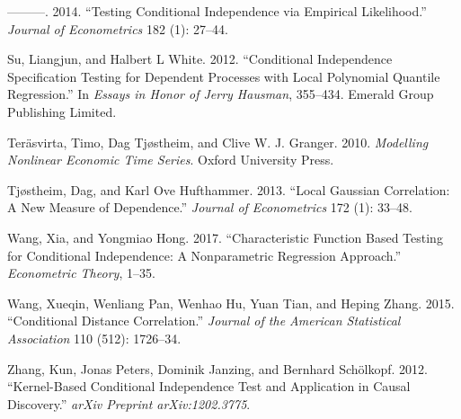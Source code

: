 \documentclass[
  12pt,
  letterpaper]{article}
\theoremstyle{definition}
\theoremstyle{definition}
\theoremstyle{definition}
\theoremstyle{remark}
\begin{document}
\leavevmode\hypertarget{ref-su2014testing}{}%
---------. 2014. ``Testing Conditional Independence via Empirical Likelihood.'' \emph{Journal of Econometrics} 182 (1): 27--44.

\leavevmode\hypertarget{ref-su2012conditional}{}%
Su, Liangjun, and Halbert L White. 2012. ``Conditional Independence Specification Testing for Dependent Processes with Local Polynomial Quantile Regression.'' In \emph{Essays in Honor of Jerry Hausman}, 355--434. Emerald Group Publishing Limited.

\leavevmode\hypertarget{ref-terasvirta2010modelling}{}%
Teräsvirta, Timo, Dag Tjøstheim, and Clive W. J. Granger. 2010. \emph{Modelling Nonlinear Economic Time Series}. Oxford University Press.

\leavevmode\hypertarget{ref-tjostheim2013local}{}%
Tjøstheim, Dag, and Karl Ove Hufthammer. 2013. ``Local Gaussian Correlation: A New Measure of Dependence.'' \emph{Journal of Econometrics} 172 (1): 33--48.

\leavevmode\hypertarget{ref-wang2017characteristic}{}%
Wang, Xia, and Yongmiao Hong. 2017. ``Characteristic Function Based Testing for Conditional Independence: A Nonparametric Regression Approach.'' \emph{Econometric Theory}, 1--35.

\leavevmode\hypertarget{ref-wang2015conditional}{}%
Wang, Xueqin, Wenliang Pan, Wenhao Hu, Yuan Tian, and Heping Zhang. 2015. ``Conditional Distance Correlation.'' \emph{Journal of the American Statistical Association} 110 (512): 1726--34.

\leavevmode\hypertarget{ref-zhang2012kernel}{}%
Zhang, Kun, Jonas Peters, Dominik Janzing, and Bernhard Schölkopf. 2012. ``Kernel-Based Conditional Independence Test and Application in Causal Discovery.'' \emph{arXiv Preprint arXiv:1202.3775}.
\end{document}
